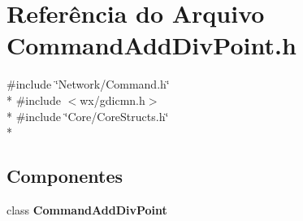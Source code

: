 \section{Referência do Arquivo Command\+Add\+Div\+Point.\+h}
\label{_command_add_div_point_8h}
{\ttfamily \#include \char`\"{}Network/\+Command.\+h\char`\"{}}\\*
{\ttfamily \#include $<$wx/gdicmn.\+h$>$}\\*
{\ttfamily \#include \char`\"{}Core/\+Core\+Structs.\+h\char`\"{}}\\*
\subsection*{Componentes}
\begin{DoxyCompactItemize}
\item 
class {\bf Command\+Add\+Div\+Point}
\end{DoxyCompactItemize}

